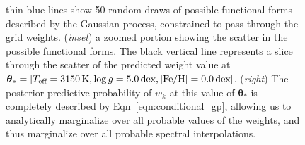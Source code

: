 \documentclass[iop,floatfix,numberedappendix,twocolappendix]{emulateapj}
\newcommand{\Z}{[{\rm Fe}/{\rm H}]}
\newcommand{\vt}{ {\bm \theta}}
\begin{document}
\begin{figure}[!t]
\begin{center}
{    thin blue lines show 50 random draws of possible functional forms described by the Gaussian
    process, constrained to pass through the grid weights. (\emph{inset}) a zoomed portion showing
    the scatter in the possible functional forms. The black vertical line represents a slice through
    the scatter of the predicted weight value at $\vt_\ast = [T_\textrm{eff} = 3150\,\textrm{K},
    \log g = 5.0\,\textrm{dex}, \Z = 0.0\, \textrm{dex}]$. (\emph{right}) The posterior predictive
    probability of $w_k$ at this value of $\vt_\ast$ is completely described by
    Eqn~\ref{eqn:conditional_gp}, allowing us to analytically marginalize over all probable values
    of the weights, and thus marginalize over all probable spectral interpolations.
\label{fig:GP_interp}}
\end{center}
\end{figure}
\end{document}
